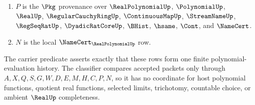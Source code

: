 \begin{definition}
\begin{enumerate}
\item $P$ is the $\Pkg$ provenance over $\RealPolynomialUp$, $\PolynomialUp$, $\RealUp$, $\RegularCauchyRingUp$, $\ContinuousMapUp$, $\StreamNameUp$, $\RegSeqRatUp$, $\DyadicRatCoreUp$, $\BHist$, $\hsame$, $\Cont$, and $\NameCert$.
\item $N$ is the local $\NameCert_{\RealPolynomialUp}$ row.
\end{enumerate}
The carrier predicate asserts exactly that these rows form one finite polynomial-evaluation history. The classifier compares accepted packets only through $A,X,Q,S,G,W,D,E,M,H,C,P,N$, so it has no coordinate for host polynomial functions, quotient real functions, selected limits, trichotomy, countable choice, or ambient $\RealUp$ completeness.
\end{definition}

